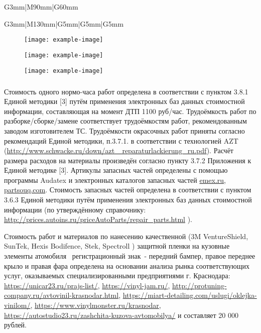 \begin{longtable}{G{3mm}|M{90mm}|G{60mm}}
\begin{longtable}{G{3mm}|M{130mm}|G{5mm}|G{5mm}|G{5mm}}
  
\begin{figure}[H]
        	\centering
        	\texttt{[image: example-image]}
        \end{figure}
  
    \begin{figure}[H]
    	\centering
    	\texttt{[image: example-image]}
    \end{figure}
    \begin{figure}[H]
    	\centering
    	\texttt{[image: example-image]}
    \end{figure}
    \medskip
    \renewcommand\baselinestretch{1.2}\small\normalsize
    

\subparagraph{}Стоимость одного нормо-часа работ определена в соответствии с пунктом 3.8.1 Единой методики [3] путём применения электронных баз данных стоимостной информации, составляющая на момент ДТП 1100 руб/час.
Трудоёмкость работ по разборке/сборке/замене  соответствует трудоёмкостям работ, рекомендованным заводом изготовителем ТС. Трудоёмкости окрасочных работ приняты согласно рекомендаций Единой методики, п.3.7.1. в соответствии с технологией  AZT (\url{http://www.schwacke.ru/down/azt _reparaturlackierung_ru.pdf}). Расчёт размера расходов на материалы произведён  согласно пункту 3.7.2 Приложения к Единой методике [3]. Артикулы запасных частей определены с помощью программы Audatex и электронных  каталогов запасных частей \url{emex.ru}, \url{partsouq.com}.
Стоимость запасных частей определена в соответствии с пунктом 3.6.3 Единой методики путём применения электронных баз данных стоимостной информации (по утверждённому справочнику: \url{http://prices.autoins.ru/priceAutoParts/repair_parts.html} ).

Стоимость работ и материалов по нанесению качественной (3M VentureShield, SunTek, Hexis Bodifence, Stek, Spectroll ) защитной пленки на кузовные элементы атомобиля   \, регистрационный знак \,- передний бампер,  правое переднее крыло и правая фара определена на основании анализа рынка соответствующих услуг, оказываемых специализированными предприятиями г. Краснодара: \url{https://unicar23.ru/prajs-list/},
\url{https://vinyl-jam.ru/}, \url{http://protuning-company.ru/avtovinil-krasnodar.html}, \url{https://miart-detailing.com/uslugi/oklejka-vinilom/}, \url{https://www.vinylmonster.ru/krasnodar}, \url{https://autostudio23.ru/zashchita-kuzova-avtomobilya/}
 и составляет 20 000 рублей.


\end{longtable}
\end{longtable}
